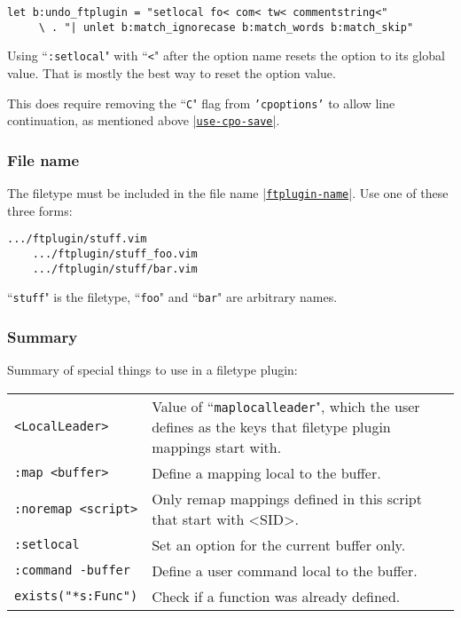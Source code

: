 \begin{Verbatim}[samepage=true]
 let b:undo_ftplugin = "setlocal fo< com< tw< commentstring<"
     \ . "| unlet b:match_ignorecase b:match_words b:match_skip"
\end{Verbatim}

Using ``\texttt{:setlocal}" with ``\texttt{<}" after the option name resets the option to its global value.
That is mostly the best way to reset the option value.

This does require removing the ``\texttt{C}" flag from \texttt{'cpoptions'} to allow line continuation, as mentioned above \hyperref[use-cpo-save]{|\texttt{use-cpo-save}|}.

\subsubsection{File name}
The filetype must be included in the file name \hyperref[ftplugin-name]{|\texttt{ftplugin-name}|}.
Use one of these three forms:

\begin{Verbatim}[samepage=true]
    .../ftplugin/stuff.vim
    .../ftplugin/stuff_foo.vim
    .../ftplugin/stuff/bar.vim
\end{Verbatim}

``\texttt{stuff}" is the filetype, ``\texttt{foo}" and ``\texttt{bar}" are arbitrary names.

\subsubsection{Summary}
\label{ftplugin-special}
Summary of special things to use in a filetype plugin:

\begin{center} \begin{tabular}{l l} %
				\texttt{<LocalLeader>} & Value of ``\texttt{maplocalleader}", which the user defines as the keys that filetype plugin mappings start with. \\
				\texttt{:map <buffer>} & Define a mapping local to the buffer. \\
				\texttt{:noremap <script>} & Only remap mappings defined in this script that start with <SID>. \\
				\texttt{:setlocal} & Set an option for the current buffer only. \\
				\texttt{:command -buffer} & Define a user command local to the buffer. \\
				\texttt{exists("*s:Func")} & Check if a function was already defined. \\
\end{tabular} \end{center}

